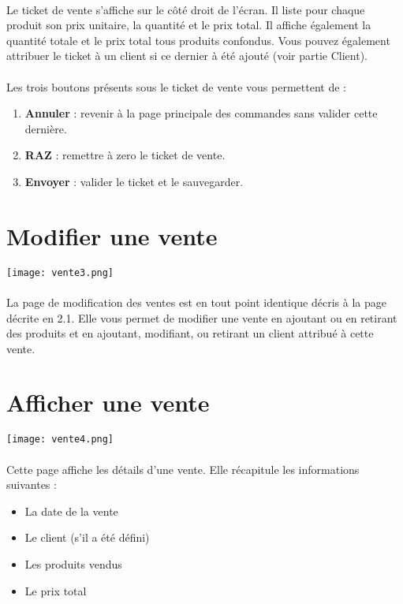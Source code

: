 \paragraph{}
Le ticket de vente s'affiche sur le côté droit de l'écran. Il liste pour chaque
produit son prix unitaire, la quantité et le prix total. Il affiche également
la quantité totale et le prix total tous produits confondus. Vous pouvez
également attribuer le ticket à un client si ce dernier à été ajouté (voir
partie Client). 

\paragraph{}
Les trois boutons présents sous le ticket de vente vous permettent de :
\begin{enumerate}
    \item \textbf{Annuler} : revenir à la page principale des commandes sans
        valider cette dernière.
    \item \textbf{RAZ} : remettre à zero le ticket de vente.
    \item \textbf{Envoyer} : valider le ticket et le sauvegarder.
\end{enumerate}

\section{Modifier une vente}

\texttt{[image: vente3.png]}

\paragraph{}
La page de modification des ventes est en tout point identique décris à la page décrite en 2.1. Elle vous permet de modifier une vente en ajoutant ou en retirant des produits et en ajoutant, modifiant, ou retirant un client attribué à cette vente.

\section{Afficher une vente}

\texttt{[image: vente4.png]}

\paragraph{}
Cette page affiche les détails d'une vente. Elle récapitule les informations suivantes : 
\begin{itemize}
    \item La date de la vente
    \item Le client (s'il a été défini)
    \item Les produits vendus
    \item Le prix total
\end{itemize}

